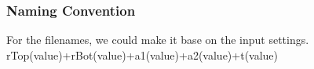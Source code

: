 \documentclass[12pt]{article}
\numberwithin{equation}{section}
\numberwithin{equation}{section}
\begin{document}
\subsubsection{Naming Convention}
For the filenames, we could make it base on the input settings.  \\
rTop(value)+rBot(value)+a1(value)+a2(value)+t(value)\\



\end{document}
